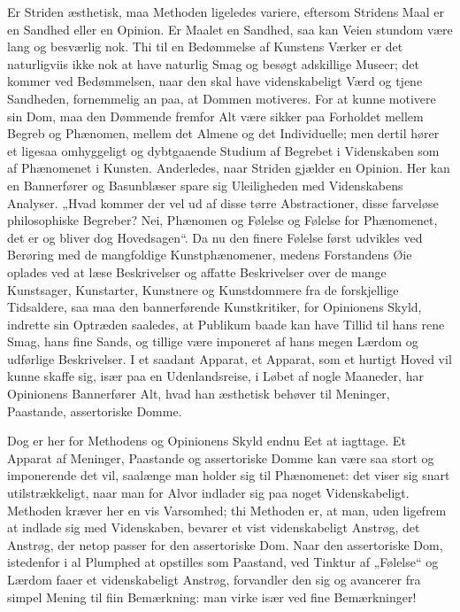 \documentclass[12pt]{book}
\newcommand{\opage}[1]{\marginnote{\footnotesize\textit{[#1]}}}
\begin{document}
Er Striden æsthetisk, maa Methoden ligeledes variere,
eftersom Stridens Maal er en Sandhed eller en Opinion.
Er Maalet en Sandhed, saa kan Veien stundom være lang
og besværlig nok. Thi til en Bedømmelse af Kunstens Værker
er det naturligviis ikke nok at have naturlig Smag og besøgt
adskillige Museer; det kommer ved Bedømmelsen, naar den skal
have videnskabeligt Værd og tjene Sandheden, fornemmelig
an paa, at Dommen motiveres. For at kunne motivere sin
Dom, maa den Dømmende fremfor Alt være sikker paa Forholdet
mellem Begreb og Phænomen, mellem det Almene og
det Individuelle; men dertil hører et ligesaa omhyggeligt og
dybtgaaende Studium af Begrebet i Videnskaben som af Phænomenet
i Kunsten. Anderledes, naar Striden gjælder en Opinion.
Her kan en Bannerfører og Basunblæser spare sig Uleiligheden
med Videnskabens Analyser. „Hvad kommer der vel ud af
disse tørre Abstractioner, disse farveløse philosophiske Begreber?
Nei, Phænomen og Følelse og Følelse for Phænomenet, det er
og bliver dog Hovedsagen“. Da nu den finere Følelse først udvikles
ved Berøring med de mangfoldige Kunstphænomener,
medens Forstandens Øie oplades ved at læse Beskrivelser og
affatte Beskrivelser over de mange Kunstsager, Kunstarter,
Kunstnere og Kunstdommere fra de forskjellige Tidsaldere,
saa maa den bannerførende Kunstkritiker, for Opinionens Skyld,
indrette sin Optræden saaledes, at Publikum baade kan have
Tillid til hans rene Smag, hans fine Sands, og tillige være
imponeret af hans megen Lærdom og udførlige Beskrivelser.
I et saadant Apparat, et Apparat, som et hurtigt Hoved
\opage{200}vil kunne skaffe sig, især paa en Udenlandsreise, i Løbet af
nogle Maaneder, har Opinionens Bannerfører Alt, hvad han
æsthetisk behøver til Meninger, Paastande, assertoriske Domme.

Dog er her for Methodens og Opinionens Skyld endnu
Eet at iagttage. Et Apparat af Meninger, Paastande og
assertoriske Domme kan være saa stort og imponerende det vil,
saalænge man holder sig til Phænomenet: det viser sig snart
utilstrækkeligt, naar man for Alvor indlader sig paa noget
Videnskabeligt. Methoden kræver her en vis Varsomhed; thi
Methoden er, at man, uden ligefrem at indlade sig med
Videnskaben, bevarer et vist videnskabeligt Anstrøg, det Anstrøg,
der netop passer for den assertoriske Dom. Naar den assertoriske
Dom, istedenfor i al Plumphed at opstilles som Paastand,
ved Tinktur af „Følelse“ og Lærdom faaer et videnskabeligt
Anstrøg, forvandler den sig og avancerer fra simpel Mening
til fiin Bemærkning: man virke især ved fine Bemærkninger!
\end{document}
